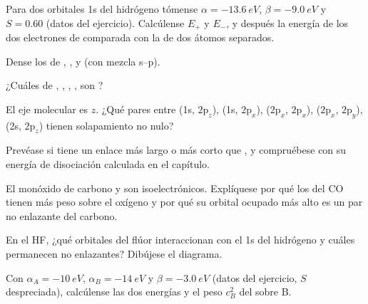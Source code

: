 \begin{exercise}[$\star$]\label{exo:b2:diatomic-mos:1}
Para dos orbitales 1s del hidrógeno tómense $\alpha = \qty{-13.6}{eV}$, $\beta = \qty{-9.0}{eV}$ y
$S = 0.60$ (datos del ejercicio). Calcúlense $E_+$ y $E_-$, y después la energía de los dos
electrones de  comparada con la de dos átomos separados.
\end{exercise}

\begin{exercise}[$\star$]\label{exo:b2:diatomic-mos:2}
Dense los  de , ,  y  (con mezcla
s--p).
\end{exercise}

\begin{exercise}[$\star$]\label{exo:b2:diatomic-mos:3}
¿Cuáles de , , , ,  son ?
\end{exercise}

\begin{exercise}[$\star$]\label{exo:b2:diatomic-mos:4}
El eje molecular es $z$. ¿Qué pares entre (1s, $2\mathrm p_z$), (1s,
$2\mathrm p_x$), ($2\mathrm p_x$, $2\mathrm p_x$), ($2\mathrm p_x$, $2\mathrm p_y$),
(2s, $2\mathrm p_z$) tienen solapamiento no nulo?
\end{exercise}

\begin{exercise}[$\star\star$]\label{exo:b2:diatomic-mos:5}
Prevéase si  tiene un enlace más largo o más corto que , y compruébese con
su energía de disociación calculada en el capítulo.
\end{exercise}

\begin{exercise}[$\star\star$]\label{exo:b2:diatomic-mos:6}
El monóxido de carbono y  son isoelectrónicos. Explíquese por qué los  del
CO tienen más peso sobre el oxígeno y por qué su orbital ocupado más alto es un par no enlazante del
carbono.
\end{exercise}

\begin{exercise}[$\star\star$]\label{exo:b2:diatomic-mos:7}
En el HF, ¿qué orbitales del flúor interaccionan con el 1s del hidrógeno y cuáles permanecen
no enlazantes? Dibújese el diagrama.
\end{exercise}

\begin{exercise}[$\star\star$]\label{exo:b2:diatomic-mos:8}
Con $\alpha_A = \qty{-10}{eV}$, $\alpha_B = \qty{-14}{eV}$ y $\beta = \qty{-3.0}{eV}$
(datos del ejercicio, $S$ despreciada), calcúlense las dos energías y el peso $c_B^2$ del
 sobre B.
\end{exercise}

